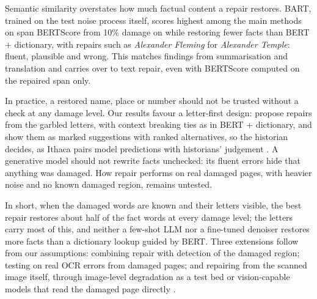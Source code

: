 Semantic similarity overstates how much factual content a repair restores. BART, trained on the test noise process
itself, scores highest among the main methods on span BERTScore from 10\% damage on while restoring fewer facts than BERT + dictionary, with
repairs such as \emph{Alexander Fleming} for \emph{Alexander Temple}: fluent, plausible and wrong. This matches
findings from summarisation and translation \citep{maynez2020faithfulness,hanna2021finegrained} and carries over to
text repair, even with BERTScore computed on the repaired span only.

In practice, a restored name, place or number should not be trusted without a check at any damage level. Our
results favour a letter-first design: propose repairs from the garbled letters, with context breaking ties as in
BERT + dictionary, and show them as marked suggestions with ranked alternatives, so the historian decides, as Ithaca pairs model predictions with historians' judgement \citep{assael2022restoring}. A
generative model should not rewrite facts unchecked: its fluent errors hide that anything was damaged. How repair
performs on real damaged pages, with heavier noise and no known damaged region, remains untested.

In short, when the damaged words are known and their letters visible, the best repair restores about half of the
fact words at every damage level; the letters carry most of this, and neither a few-shot LLM nor a fine-tuned
denoiser restores more facts than a dictionary lookup guided by BERT. Three extensions follow from our assumptions:
combining repair with detection of the damaged region; testing on real OCR errors from damaged pages; and repairing
from the scanned image itself, through image-level degradation as a test bed \citep{hamdi2020assessing} or
vision-capable models that read the damaged page directly \citep[cf.][]{kanerva2025ocr}.
